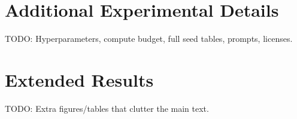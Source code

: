 \section{Additional Experimental Details}
\label{app:details}

TODO: Hyperparameters, compute budget, full seed tables, prompts, licenses.

\section{Extended Results}
\label{app:results}

TODO: Extra figures/tables that clutter the main text.
